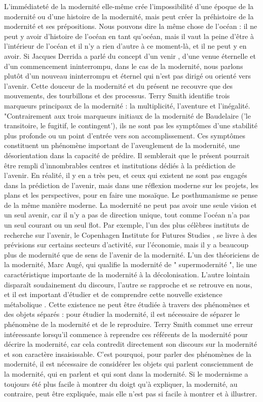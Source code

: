 \documentclass[a4paper, twoside, 12pt]{book}
\begin{document}
L'immédiateté de la modernité elle-même crée l'impossibilité d'une époque de la modernité ou d'une histoire de la modernité, mais peut créer la préhistoire de la modernité et ses prépositions. Nous pouvons dire la même chose de l'océan : il ne peut y avoir d'histoire de l'océan en tant qu'océan, mais il vaut la peine d'être à l'intérieur de l'océan et il n'y a rien d'autre à ce moment-là, et il ne peut y en avoir. Si Jacques Derrida a parlé du concept d'un venir , d'une venue éternelle et d'un commencement ininterrompu, dans le cas de la modernité, nous parlons plutôt d'un nouveau ininterrompu et éternel qui n'est pas dirigé ou orienté vers l'avenir. Cette douceur de la modernité et du présent ne recouvre que des mouvements, des tourbillons et des processus. 
Terry Smith identifie trois marqueurs principaux de la modernité : la multiplicité, l'aventure et l'inégalité. "Contrairement aux trois marqueurs initiaux de la modernité de Baudelaire ('le transitoire, le fugitif, le contingent'), ils ne sont pas les symptômes d'une stabilité plus profonde ou un point d'entrée vers son accomplissement. Ces symptômes constituent un phénomène important de l'aveuglement de la modernité, une désorientation dans la capacité de prédire. 
Il semblerait que le présent pourrait être rempli d'innombrables centres et institutions dédiés à la prédiction de l'avenir. En réalité, il y en a très peu, et ceux qui existent ne sont pas engagés dans la prédiction de l'avenir, mais dans une réflexion moderne sur les projets, les plans et les perspectives, pour en faire une mosaïque. Le posthumanisme se pense de la même manière moderne. La modernité ne peut pas avoir une seule vision et un seul avenir, car il n'y a pas de direction unique, tout comme l'océan n'a pas un seul courant ou un seul flot. Par exemple, l'un des plus célèbres instituts de recherche sur l'avenir, le Copenhagen Institute for Futures Studies , se livre à des prévisions sur certains secteurs d'activité, sur l'économie, mais il y a beaucoup plus de modernité que de sens de l'avenir de la modernité. 
L'un des théoriciens de la modernité, Marc Augé, qui qualifie la modernité de " supermodernité ", lie une caractéristique importante de la modernité à la décolonisation. L'autre lointain disparaît soudainement du discours, l'autre se rapproche et se retrouve en nous, et il est important d'étudier et de comprendre cette nouvelle existence métabolique . Cette existence ne peut être étudiée à travers des phénomènes et des objets séparés : pour étudier la modernité, il est nécessaire de séparer le phénomène de la modernité et de le reproduire. Terry Smith commet une erreur intéressante lorsqu'il commence à reprendre ces référents de la modernité pour décrire la modernité, car cela contredit directement son discours sur la modernité et son caractère insaisissable. C'est pourquoi, pour parler des phénomènes de la modernité, il est nécessaire de considérer les objets qui parlent consciemment de la modernité, qui en parlent et qui sont dans la modernité. Si le modernisme a toujours été plus facile à montrer du doigt qu'à expliquer, la modernité, au contraire, peut être expliquée, mais elle n'est pas si facile à montrer et à illustrer. 
\end{document}
